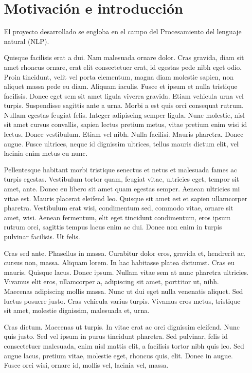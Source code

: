 \chapter{Motivación e introducción}
\label{introducción}
El proyecto desarrollado se engloba en el campo del Procesamiento del lenguaje natural (NLP). \citet*{Knuth1968}

Quisque facilisis erat a dui. Nam malesuada ornare dolor. Cras gravida, diam sit amet rhoncus ornare, erat elit consectetuer erat, id egestas pede nibh eget odio. Proin tincidunt, velit vel porta elementum, magna diam molestie sapien, non aliquet massa pede eu diam. Aliquam iaculis. Fusce et ipsum et nulla tristique facilisis. Donec eget sem sit amet ligula viverra gravida. Etiam vehicula urna vel turpis. Suspendisse sagittis ante a urna. Morbi a est quis orci consequat rutrum. Nullam egestas feugiat felis. Integer adipiscing semper ligula. Nunc molestie, nisl sit amet cursus convallis, sapien lectus pretium metus, vitae pretium enim wisi id lectus. Donec vestibulum. Etiam vel nibh. Nulla facilisi. Mauris pharetra. Donec augue. Fusce ultrices, neque id dignissim ultrices, tellus mauris dictum elit, vel lacinia enim metus eu nunc.

Pellentesque habitant morbi tristique senectus et netus et malesuada fames ac turpis egestas. Vestibulum tortor quam, feugiat vitae, ultricies eget, tempor sit amet, ante. Donec eu libero sit amet quam egestas semper. Aenean ultricies mi vitae est. Mauris placerat eleifend leo. Quisque sit amet est et sapien ullamcorper pharetra. Vestibulum erat wisi, condimentum sed, commodo vitae, ornare sit amet, wisi. Aenean fermentum, elit eget tincidunt condimentum, eros ipsum rutrum orci, sagittis tempus lacus enim ac dui. Donec non enim in turpis pulvinar facilisis. Ut felis.

Cras sed ante. Phasellus in massa. Curabitur dolor eros, gravida et, hendrerit ac, cursus non, massa. Aliquam lorem. In hac habitasse platea dictumst. Cras eu mauris. Quisque lacus. Donec ipsum. Nullam vitae sem at nunc pharetra ultricies. Vivamus elit eros, ullamcorper a, adipiscing sit amet, porttitor ut, nibh. Maecenas adipiscing mollis massa. Nunc ut dui eget nulla venenatis aliquet. Sed luctus posuere justo. Cras vehicula varius turpis. Vivamus eros metus, tristique sit amet, molestie dignissim, malesuada et, urna.

Cras dictum. Maecenas ut turpis. In vitae erat ac orci dignissim eleifend. Nunc quis justo. Sed vel ipsum in purus tincidunt pharetra. Sed pulvinar, felis id consectetuer malesuada, enim nisl mattis elit, a facilisis tortor nibh quis leo. Sed augue lacus, pretium vitae, molestie eget, rhoncus quis, elit. Donec in augue. Fusce orci wisi, ornare id, mollis vel, lacinia vel, massa.

